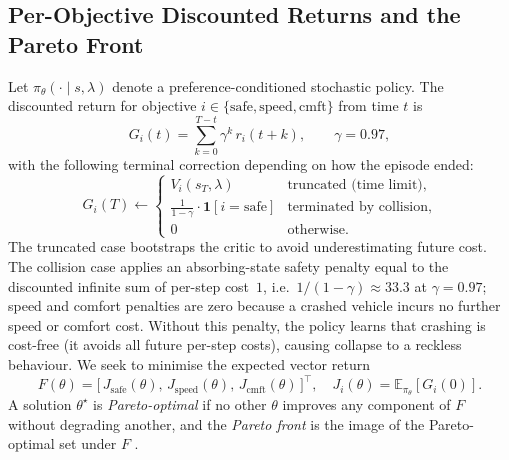 \documentclass[12pt, letterpaper]{article}
\begin{document}
\subsection{Per-Objective Discounted Returns and the Pareto Front}
Let $\pi_{\theta}(\cdot \mid s, \lambda)$ denote a preference-conditioned stochastic policy. The discounted return for objective $i \in \{\text{safe}, \text{speed}, \text{cmft}\}$ from time $t$ is
\begin{equation}
    G_i(t) = \sum_{k=0}^{T-t} \gamma^{k}\, r_i(t{+}k), \qquad \gamma = 0.97,
\end{equation}
with the following terminal correction depending on how the episode ended:
\begin{equation}
    G_i(T) \leftarrow
    \begin{cases}
        V_i(s_T, \lambda) & \text{truncated (time limit)}, \\
        \frac{1}{1-\gamma} \cdot \mathbf{1}[i=\text{safe}] & \text{terminated by collision}, \\
        0 & \text{otherwise.}
    \end{cases}
\end{equation}
The truncated case bootstraps the critic to avoid underestimating future cost. The collision case applies an absorbing-state safety penalty equal to the discounted infinite sum of per-step cost~$1$, i.e.\ $1/(1-\gamma)\approx 33.3$ at $\gamma=0.97$; speed and comfort penalties are zero because a crashed vehicle incurs no further speed or comfort cost. Without this penalty, the policy learns that crashing is cost-free (it avoids all future per-step costs), causing collapse to a reckless behaviour. We seek to minimise the expected vector return
\begin{equation}
    F(\theta) = \big[\, J_{\text{safe}}(\theta),\, J_{\text{speed}}(\theta),\, J_{\text{cmft}}(\theta)\,\big]^{\top}, \quad J_i(\theta) = \mathbb{E}_{\pi_{\theta}}\!\left[ G_i(0) \right].
\end{equation}
A solution $\theta^{\star}$ is \emph{Pareto-optimal} if no other $\theta$ improves any component of $F$ without degrading another, and the \emph{Pareto front} is the image of the Pareto-optimal set under $F$ \cite{deb2002fast,roijers2013survey}.
\end{document}
